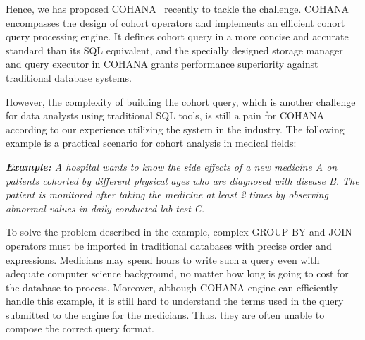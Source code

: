 \documentclass[10pt,conference,letterpaper]{IEEEtran}
\begin{document}
Hence, we has proposed COHANA~\cite{jiang2016cohort} recently to tackle the challenge.
COHANA encompasses the design of cohort operators and implements an efficient cohort query processing engine. It defines cohort query in a more concise and accurate standard than its SQL equivalent, and the specially designed storage manager and query executor in COHANA grants performance superiority against traditional database systems. 

However, the complexity of building the cohort query, which is another challenge for data analysts using traditional SQL tools, is still a pain for COHANA according to our experience utilizing the system in the industry.
The following example is a practical scenario for cohort analysis in medical fields:

\emph{\textbf{Example:} A hospital wants to know the side effects of a new medicine A on patients cohorted by different physical ages who are diagnosed with disease B. The patient is monitored after taking the medicine at least 2 times by observing abnormal values in daily-conducted lab-test C.}

To solve the problem described in the example, complex GROUP BY and JOIN operators must be imported in traditional databases with precise order and expressions.
Medicians may spend hours to write such a query even with adequate computer science background, no matter how long is going to cost for the database to process.
Moreover, although COHANA engine can efficiently handle this example, it is still hard to understand the terms used in the query submitted to the engine for the medicians.
Thus. they are often unable to compose the correct query format.

\end{document}
